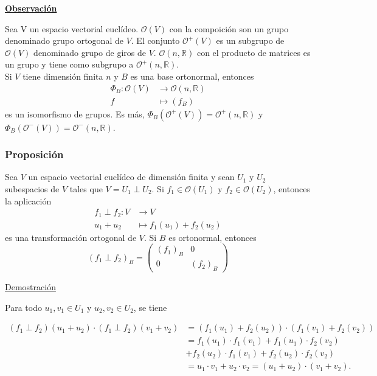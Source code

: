 \documentclass[12pt, a4paper, ones, notitlepage, openany,titlepage]{article}
\newcommand{\demostracion}{\noindent\underline{Demostración}}
\newcommand{\observacion}{\noindent\underline{\textbf{Observación}}}
\begin{document}
\observacion

Sea V un espacio vectorial euclídeo. $\mathcal{O}(V)$ con la compoición son un grupo denominado grupo ortogonal de $V$. El conjunto $\mathcal{O}^+(V)$ es un subgrupo de $\mathcal{O}(V)$ denominado grupo de giros de $V$. $\mathcal{O}(n,\mathbb{R})$ con el producto de matrices es un grupo y tiene como subgrupo a $\mathcal{O}^+(n, \mathbb{R})$.\\
Si $V$ tiene dimensión finita $n$ y $B$ es una base ortonormal, entonces
$$
\begin{aligned}
	\Phi_B : \mathcal{O}(V) & \longrightarrow \mathcal{O}(n,\mathbb{R}) \\
	f & \longmapsto (f_B)
\end{aligned}
$$
\noindent es un isomorfismo de grupos. Es más, $\Phi_B(\mathcal{O}^+(V)) = \mathcal{O}^+(n, \mathbb{R})$ y $\Phi_B(\mathcal{O}^-(V)) = \mathcal{O}^-(n, \mathbb{R})$. 

\subsubsection{Proposición}
Sea $V$ un espacio vectorial euclídeo de dimensión finita y sean $U_{1}$ y $U_{2}$ subespacios de $V$ tales que $V=U_{1} \perp U_{2}$. Si $f_{1} \in \mathcal{O}\left(U_{1}\right)$ y $f_{2} \in \mathcal{O}\left(U_{2}\right)$, entonces la aplicación
$$
\begin{aligned}
	f_{1} \perp f_{2}: V & \longrightarrow V \\
	u_1 + u_2 & \longmapsto f_1(u_1) + f_2(u_2)
\end{aligned}
$$
\noindent es una transformación ortogonal de $V$. Si $B$ es ortonormal, entonces
$$
(f_1 \perp f_2)_B = 
\left(\begin{array}{c|c}
	(f_1)_B & 0 \\
	\hline
	0 & (f_2)_B
\end{array}\right)
$$

\demostracion

\noindent Para todo $u_{1}, v_{1} \in U_{1}$ y $u_{2}, v_{2} \in U_{2}$, se tiene

$$
\begin{aligned}
	\left(f_{1} \perp f_{2}\right)\left(u_{1}+u_{2}\right) \cdot\left(f_{1} \perp f_{2}\right)\left(v_{1}+v_{2}\right) & =\left(f_{1}\left(u_{1}\right)+f_{2}\left(u_{2}\right)\right) \cdot\left(f_{1}\left(v_{1}\right)+f_{2}\left(v_{2}\right)\right) \\
	& =f_{1}\left(u_{1}\right) \cdot f_{1}\left(v_{1}\right)+f_{1}\left(u_{1}\right) \cdot f_{2}\left(v_{2}\right) \\
	& +f_{2}\left(u_{2}\right) \cdot f_{1}\left(v_{1}\right)+f_{2}\left(u_{2}\right) \cdot f_{2}\left(v_{2}\right) \\
	& =u_{1} \cdot v_{1}+u_{2} \cdot v_{2}=\left(u_{1}+u_{2}\right) \cdot\left(v_{1}+v_{2}\right) .
\end{aligned}
$$
\end{document}
